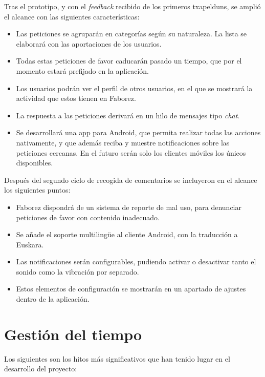 \documentclass[main]{subfiles}
\begin{document}
Tras el prototipo, y con el \emph{feedback} recibido de los primeros \glspl{txapeldun}, se amplió el alcance con las siguientes características:

\begin{itemize}
  \item Las peticiones se agruparán en categorías según su naturaleza. La lista se elaborará con las aportaciones de los usuarios.
  \item Todas estas peticiones de favor caducarán pasado un tiempo, que por el momento estará prefijado en la aplicación.
  \item Los usuarios podrán ver el perfil de otros usuarios, en el que se mostrará la actividad que estos tienen en Faborez.
  \item La respuesta a las peticiones derivará en un hilo de mensajes tipo \emph{chat}.
  \item Se desarrollará una \gls{app} para Android, que permita realizar todas las acciones nativamente, y que además reciba y muestre notificaciones sobre las peticiones cercanas. En el futuro serán solo los clientes móviles los únicos disponibles.
\end{itemize}

Después del segundo ciclo de recogida de comentarios se incluyeron en el alcance los siguientes puntos:

\begin{itemize}
  \item Faborez dispondrá de un sistema de reporte de mal uso, para denunciar peticiones de favor con contenido inadecuado.
  \item Se añade el soporte multilingüe al cliente Android, con la traducción a Euskara.
  \item Las notificaciones serán configurables, pudiendo activar o desactivar tanto el sonido como la vibración por separado.
  \item Estos elementos de configuración se mostrarán en un apartado de ajustes dentro de la aplicación.
\end{itemize}


\section{Gestión del tiempo}

Los siguientes son los hitos más significativos que han tenido lugar en el desarrollo del proyecto:
\end{document}
